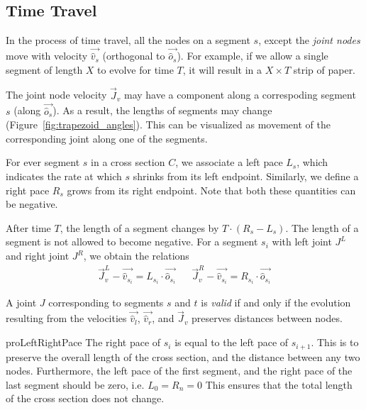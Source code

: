 \subsection{Time Travel}
\label{sec:time_travel}

In the process of time travel, all the nodes on a segment $s$,
except the \emph{joint nodes} move with velocity $\vec{\hat v_s}$ (orthogonal to $\vec{\hat o_s}$).
For example, if we allow a single segment of length $X$ to evolve for time $T$, it will result in a $X\times T$ strip of paper.

The joint node velocity $\vec J_v$ may have a component along a correspoding segment $s$ (along $\vec{\hat o_s}$).
As a result, the lengths of segments may change (Figure~\ref{fig:trapezoid_angles}).
This can be visualized as movement of the corresponding joint along one of the segments.

\begin{definition}
\label{def:segment_length}
For ever segment $s$ in a cross section $C$, we associate a left pace $L_s$,
which indicates the rate at which $s$ shrinks from its left endpoint.
Similarly, we define a right pace $R_s$ grows from its right endpoint.
Note that both these quantities can be negative.
\end{definition}
After time $T$, the length of a segment changes by $T\cdot(R_s-L_s)$.
The length of a segment is not allowed to become negative.
For a segment $s_i$ with left joint $J^L$ and right joint $J^R$, we obtain the relations
\begin{align}
\vec J_v^L-\vec{\hat v_{s_i}} = L_{s_i}\cdot \vec{\hat o_{s_i}} && \vec J_v^R-\vec{\hat v_{s_i}} = R_{s_i}\cdot \vec{\hat o_{s_i}}
\end{align}

\begin{proposition}
\label{prop:valid_joint}
A joint $J$ corresponding to segments $s$ and $t$ is \emph{valid} if and only if the evolution
resulting from the velocities $\vec{\hat v_l}$, $\vec{\hat v_r}$, and $\vec J_v$ preserves distances between nodes.
\end{proposition}
\begin{restatable}{pro}{LeftRightPace}
\label{pro:left_right_pace}
The right pace of $s_{i}$ is equal to the left pace of $s_{i+1}$.
This is to preserve the overall length of the cross section, and the distance between any two nodes.
Furthermore, the left pace of the first segment, and the right pace of the last segment should be zero, i.e. $L_0 = R_n = 0$
This ensures that the total length of the cross section does not change.
\end{restatable}

